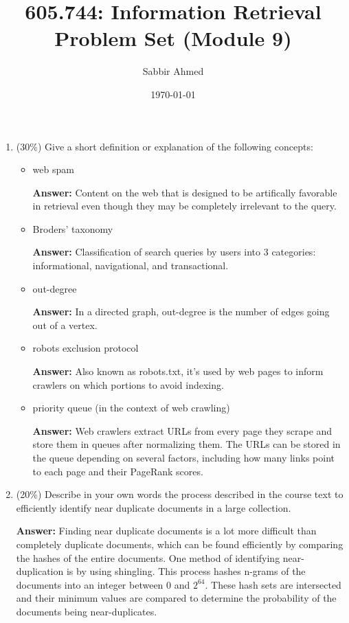 \documentclass[11pt]{article}
\title{605.744: Information Retrieval \\ Problem Set (Module 9)}
\author{Sabbir Ahmed}
\date{\today}
\begin{document}
\maketitle

\begin{enumerate}

    \item (30\%) Give a short definition or explanation of the following concepts:
          \begin{itemize}
              \item web spam

                    \textbf{Answer:} Content on the web that is designed to be artifically favorable in retrieval even though they may be completely irrelevant to the query.

              \item Broders' taxonomy

                    \textbf{Answer:} Classification of search queries by users into 3 categories: informational, navigational, and transactional.

              \item out-degree

                    \textbf{Answer:} In a directed graph, out-degree is the number of edges going out of a vertex.

              \item robots exclusion protocol

                    \textbf{Answer:} Also known as robots.txt, it's used by web pages to inform crawlers on which portions to avoid indexing.

              \item priority queue (in the context of web crawling)

                    \textbf{Answer:} Web crawlers extract URLs from every page they scrape and store them in queues after normalizing them. The URLs can be stored in the queue depending on several factors, including how many links point to each page and their PageRank scores.

          \end{itemize}

    \item (20\%) Describe in your own words the process described in the course text to efficiently identify near duplicate documents in a large collection.

          \textbf{Answer:} Finding near duplicate documents is a lot more difficult than completely duplicate documents, which can be found efficiently by comparing the hashes of the entire documents. One method of identifying near-duplication is by using shingling. This process hashes n-grams of the documents into an integer between 0 and $2^{64}$. These hash sets are intersected and their minimum values are compared to determine the probability of the documents being near-duplicates.


\end{enumerate}
\end{document}
